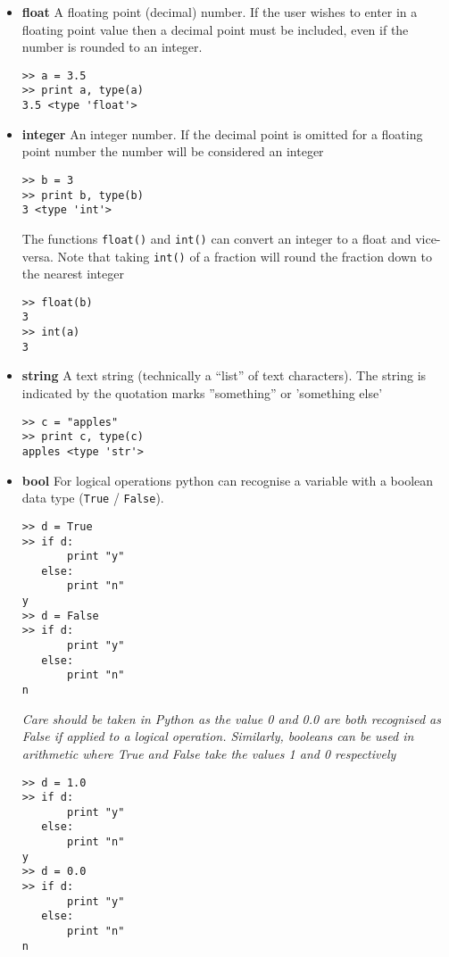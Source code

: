 \begin{itemize}
\item \textbf{float} A floating point (decimal) number. If the user wishes to enter in a floating point value then a decimal point must be included, even if the number is rounded to an integer.

\begin{lstlisting}[frame=single]
>> a = 3.5
>> print a, type(a)
3.5 <type 'float'>
\end{lstlisting}

\item \textbf{integer} An integer number. If the decimal point is omitted for a floating point number the number will be considered an integer

\begin{lstlisting}[frame=single]
>> b = 3
>> print b, type(b)
3 <type 'int'>
\end{lstlisting}

The functions \verb=float()= and \verb=int()= can convert an integer to a float and vice-versa. Note that taking \verb=int()= of a fraction will round the fraction down to the nearest integer

\begin{lstlisting}[frame=single]
>> float(b)
3
>> int(a)
3
\end{lstlisting}

\item \textbf{string} A text string (technically a ``list'' of text characters). The string is indicated by the quotation marks ''something'' or 'something else'

\begin{lstlisting}[frame=single]
>> c = "apples"
>> print c, type(c)
apples <type 'str'>
\end{lstlisting}

\item \textbf{bool} For logical operations python can recognise a variable with a boolean data type (\verb=True= / \verb=False=).

\begin{lstlisting}[frame=single]
>> d = True
>> if d:
       print "y"
   else:
       print "n"
y
>> d = False
>> if d:
       print "y"
   else:
       print "n"
n
\end{lstlisting}

\emph{Care should be taken in Python as the value 0 and 0.0 are both recognised as False if applied to a logical operation. Similarly, booleans can be used in arithmetic where True and False take the values 1 and 0 respectively}

\begin{lstlisting}[frame=single]
>> d = 1.0
>> if d:
       print "y"
   else:
       print "n"
y
>> d = 0.0
>> if d:
       print "y"
   else:
       print "n"
n
\end{lstlisting}
\end{itemize}

